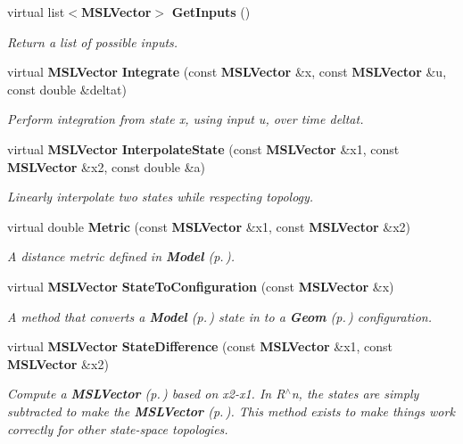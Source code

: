 \begin{CompactItemize}
virtual list$<${\bf MSLVector}$>$ {\bf Get\-Inputs} ()
\begin{CompactList}\small\item\em Return a list of possible inputs.\item\end{CompactList}\item 
virtual {\bf MSLVector} {\bf Integrate} (const {\bf MSLVector} \&x, const {\bf MSLVector} \&u, const double \&deltat)
\begin{CompactList}\small\item\em Perform integration from state x, using input u, over time deltat.\item\end{CompactList}\item 
virtual {\bf MSLVector} {\bf Interpolate\-State} (const {\bf MSLVector} \&x1, const {\bf MSLVector} \&x2, const double \&a)
\begin{CompactList}\small\item\em Linearly interpolate two states while respecting topology.\item\end{CompactList}\item 
virtual double {\bf Metric} (const {\bf MSLVector} \&x1, const {\bf MSLVector} \&x2)
\begin{CompactList}\small\item\em A distance metric defined in {\bf Model} {\rm (p.\,\pageref{class_Model})}.\item\end{CompactList}\item 
virtual {\bf MSLVector} {\bf State\-To\-Configuration} (const {\bf MSLVector} \&x)
\begin{CompactList}\small\item\em A method that converts a {\bf Model} {\rm (p.\,\pageref{class_Model})} state in to a {\bf Geom} {\rm (p.\,\pageref{class_Geom})} configuration.\item\end{CompactList}\item 
virtual {\bf MSLVector} {\bf State\-Difference} (const {\bf MSLVector} \&x1, const {\bf MSLVector} \&x2)
\begin{CompactList}\small\item\em Compute a {\bf MSLVector} {\rm (p.\,\pageref{class_MSLVector})} based on x2-x1. In R$^\wedge$n, the states are simply subtracted to make the {\bf MSLVector} {\rm (p.\,\pageref{class_MSLVector})}. This method exists to make things work correctly for other state-space topologies.\item\end{CompactList}\item 

\end{CompactItemize}
